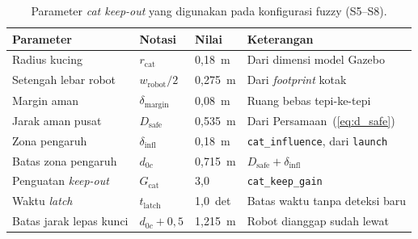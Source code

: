 \begin{table}[H]
\centering
\caption{Parameter \textit{cat keep-out} yang digunakan pada konfigurasi fuzzy (S5--S8).}
\label{tab:param_cat}
\begin{tabular}{llll}
\toprule
\textbf{Parameter} & \textbf{Notasi} & \textbf{Nilai} & \textbf{Keterangan} \\
\midrule
Radius kucing       & $r_\text{cat}$          & 0,18~m & Dari dimensi model Gazebo \\
Setengah lebar robot & $w_\text{robot}/2$     & 0,275~m & Dari \textit{footprint} kotak \\
Margin aman         & $\delta_\text{margin}$  & 0,08~m & Ruang bebas tepi-ke-tepi \\
Jarak aman pusat    & $D_\text{safe}$         & 0,535~m & Dari Persamaan~(\ref{eq:d_safe}) \\
Zona pengaruh       & $\delta_\text{infl}$    & 0,18~m & \texttt{cat\_influence}, dari \texttt{launch} \\
Batas zona pengaruh & $d_{0c}$                & 0,715~m & $D_\text{safe} + \delta_\text{infl}$ \\
Penguatan \textit{keep-out} & $G_\text{cat}$  & 3,0    & \texttt{cat\_keep\_gain} \\
Waktu \textit{latch} & $t_\text{latch}$       & 1,0~det & Batas waktu tanpa deteksi baru \\
Batas jarak lepas kunci & $d_{0c} + 0{,}5$ & 1,215~m & Robot dianggap sudah lewat \\
\bottomrule
\end{tabular}
\end{table}